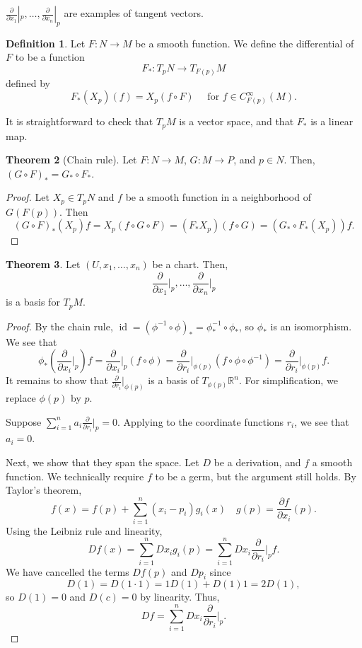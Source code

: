 \documentclass[]{article}
\DeclareMathOperator{\id}{id}
\theoremstyle{definition}
\newtheorem{theorem}{Theorem}[section] %
\theoremstyle{definition}
\newtheorem{definition}[theorem]{Definition} %
\begin{document}
$\frac{\partial}{\partial x_1}|_p, \dots, \frac{\partial}{\partial x_n}|_p$ are examples of tangent vectors. 

\begin{definition}
    Let $F: N \rightarrow M$ be a smooth function. We define the differential of $F$ to be a function\[F_*:T_pN \rightarrow T_{F(p)}M\] defined by \[F_*(X_p)(f)=X_p(f\circ F)\quad \text{ for } f\in C^\infty_{F(p)}(M).\]
\end{definition}

It is straightforward to check that $T_pM$ is a vector space, and that $F_*$ is a linear map.

\begin{theorem}[Chain rule]
    Let $F:N \rightarrow M$, $G:M \rightarrow P$, and $p\in N$. Then, $(G\circ F)_*=G_*\circ F_*$.
\end{theorem}
\begin{proof}
    Let $X_p\in T_pN$ and $f$ be a smooth function in a neighborhood of $G(F(p))$. Then \[(G\circ F)_*(X_p)f=X_p(f\circ G\circ F)=(F_*X_p)(f\circ G)=(G_*\circ F_*(X_p))f.\]
\end{proof}

\begin{theorem}
    Let $(U, x_1, \dots, x_n)$ be a chart. Then, \[\frac{\partial}{\partial x_1}\bigg|_p, \dots, \frac{\partial}{\partial x_n}\bigg|_p\] is a basis for $T_pM$.
\end{theorem}
\begin{proof}
    By the chain rule, $\id=(\phi^{-1}\circ\phi)_*=\phi^{-1}_*\circ \phi_*$, so $\phi_*$ is an isomorphism. We see that \[\phi_*\left(\frac{\partial}{\partial x_i}\bigg|_p\right)f=\frac{\partial}{\partial x_i}\bigg|_p(f\circ\phi)=\frac{\partial}{\partial r_i}\bigg|_{\phi(p)}(f\circ\phi\circ\phi^{-1})=\frac{\partial}{\partial r_i}|_{\phi(p)}f.\] It remains to show that $\frac{\partial}{\partial r_i}|_{\phi(p)}$ is a basis of $T_{\phi(p)}\mathbb{R}^n$. For simplification, we replace $\phi(p)$ by $p$.

    Suppose $\sum_{i=1}^{n}a_i\frac{\partial}{\partial r_i}|_{p}=0$. Applying to the coordinate functions $r_i$, we see that $a_i=0$.

    Next, we show that they span the space. Let $D$ be a derivation, and $f$ a smooth function. We technically require $f$ to be a germ, but the argument still holds. By Taylor's theorem, \[f(x)=f(p)+\sum_{i=1}^{n}(x_i-p_i)g_i(x)\quad g(p)=\frac{\partial f}{\partial x_i}(p).\] Using the Leibniz rule and linearity, \[Df(x)=\sum_{i=1}^{n}Dx_ig_i(p)=\sum_{i=1}^{n}Dx_i\frac{\partial}{\partial r_i}\bigg|_{p}f.\] We have cancelled the terms $Df(p)$ and $Dp_i$ since \[D(1)=D(1\cdot 1)=1D(1)+D(1)1=2D(1),\] so $D(1)=0$ and $D(c)=0$ by linearity. Thus, \[Df=\sum_{i=1}^{n}Dx_i\frac{\partial}{\partial r_i}\bigg|_{p}.\]
\end{proof}
\end{document}
